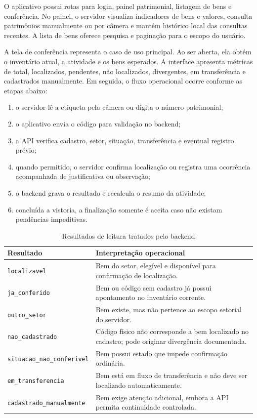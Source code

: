 \documentclass[12pt,a4paper]{article}
\begin{document}
O aplicativo possui rotas para login, painel patrimonial, listagem de bens e
conferência. No painel, o servidor visualiza indicadores de bens e valores,
consulta patrimônios manualmente ou por câmera e mantém histórico local das
consultas recentes. A lista de bens oferece pesquisa e paginação para o escopo
do usuário.

A tela de conferência representa o caso de uso principal. Ao ser aberta, ela
obtém o inventário atual, a atividade e os bens esperados. A interface
apresenta métricas de total, localizados, pendentes, não localizados,
divergentes, em transferência e cadastrados manualmente. Em seguida, o fluxo
operacional ocorre conforme as etapas abaixo:

\begin{enumerate}
  \item o servidor lê a etiqueta pela câmera ou digita o número patrimonial;
  \item o aplicativo envia o código para validação no backend;
  \item a API verifica cadastro, setor, situação, transferência e eventual
  registro prévio;
  \item quando permitido, o servidor confirma localização ou registra uma
  ocorrência acompanhada de justificativa ou observação;
  \item o backend grava o resultado e recalcula o resumo da atividade;
  \item concluída a vistoria, a finalização somente é aceita caso não existam
  pendências impeditivas.
\end{enumerate}

\begin{table}[H]
\centering
\caption{Resultados de leitura tratados pelo backend}
\label{tab:leitura}
\small
\begin{tabularx}{\textwidth}{L{3.6cm} Y}
\toprule
\textbf{Resultado} & \textbf{Interpretação operacional} \\
\midrule
\texttt{localizavel} & Bem do setor, elegível e disponível para confirmação
de localização. \\
\texttt{ja\_conferido} & Bem ou código sem cadastro já possui apontamento no
inventário corrente. \\
\texttt{outro\_setor} & Bem existe, mas não pertence ao escopo setorial do
servidor. \\
\texttt{nao\_cadastrado} & Código físico não corresponde a bem localizado no
cadastro; pode originar divergência documentada. \\
\texttt{situacao\_nao\_conferivel} & Bem possui estado que impede confirmação
ordinária. \\
\texttt{em\_transferencia} & Bem está em fluxo de transferência e não deve ser
localizado automaticamente. \\
\texttt{cadastrado\_manualmente} & Bem exige atenção adicional, embora a API
permita continuidade controlada. \\
\bottomrule
\end{tabularx}
\end{table}
\end{document}
